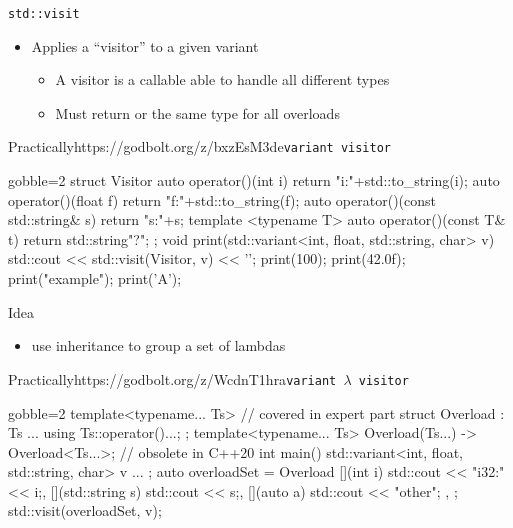 \begin{frame}[fragile]
  \begin{block}{\texttt{std::visit} }
    \begin{itemize}
      \item Applies a ``visitor'' to a given variant
      \begin{itemize}
        \item A visitor is a callable able to handle all different types
        \item Must return  or the same type for all overloads
      \end{itemize}
    \end{itemize}
  \end{block}
  \begin{exampleblockGB}{Practically}{https://godbolt.org/z/bxzEsM3de}{\texttt{variant visitor}}
    \small
    \begin{cppcode*}{gobble=2}
      struct Visitor {
        auto operator()(int i)   {return "i:"+std::to_string(i);}
        auto operator()(float f) {return "f:"+std::to_string(f);}
        auto operator()(const std::string& s) { return "s:"+s;}
        template <typename T>
        auto operator()(const T& t) { return std::string{"?"}; }
      };
      void print(std::variant<int, float, std::string, char> v) {
        std::cout << std::visit(Visitor{}, v) << '\n';
      }
      print(100); print(42.0f); print("example"); print('A');
    \end{cppcode*}
  \end{exampleblockGB}
\end{frame}

\begin{frame}[fragile]
  \begin{block}{Idea}
    \begin{itemize}
    \item use inheritance to group a set of lambdas
    \end{itemize}
  \end{block}
  \begin{exampleblockGB}{Practically}{https://godbolt.org/z/WcdnT1hra}{\texttt{variant $\lambda$ visitor}}
    \small
    \begin{cppcode*}{gobble=2}
      template<typename... Ts> // covered in expert part
      struct Overload : Ts ... { using Ts::operator()...; };
      template<typename... Ts>
      Overload(Ts...) -> Overload<Ts...>; // obsolete in C++20
      int main(){
        std::variant<int, float, std::string, char> v{ ... };
        auto overloadSet = Overload {
          [](int i) { std::cout << "i32:" << i;},
          [](std::string s) { std::cout << s;},
          [](auto a) { std::cout << "other"; },
        };
        std::visit(overloadSet, v);
      }
    \end{cppcode*}
  \end{exampleblockGB}
\end{frame}

